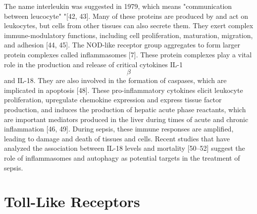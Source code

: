 The name interleukin was suggested in 1979, which means "communication
between leucocyte" "{[}42, 43{]}. Many of these proteins are produced by
and act on leukocytes, but cells from other tissues can also secrete
them. They exert complex immune-modulatory functions, including cell
proliferation, maturation, migration, and adhesion {[}44, 45{]}. The
NOD-like receptor group aggregates to form larger protein complexes
called inflammasomes {[}7{]}. These protein complexes play a vital role
in the production and release of critical cytokines IL-1$$\beta$$and IL-18.
They are also involved in the formation of caspases, which are
implicated in apoptosis {[}48{]}. These pro-inflammatory cytokines
elicit leukocyte proliferation, upregulate chemokine expression and
express tissue factor production, and induces the production of hepatic
acute phase reactants, which are important mediators produced in the
liver during times of acute and chronic inflammation {[}46, 49{]}.
During sepsis, these immune responses are amplified, leading to damage
and death of tissues and cells. Recent studies that have analyzed the
association between IL-18 levels and mortality {[}50--52{]} suggest the
role of inflammasomes and autophagy as potential targets in the
treatment of sepsis.

\section{ Toll-Like Receptors }\label{toll-like-receptors}

